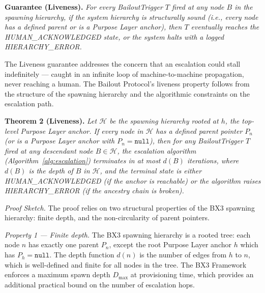 \documentclass[12pt]{article}
\begin{document}
\bigskip

\begin{minipage}{\linewidth}
\textbf{Guarantee (Liveness).} \textit{For every BailoutTrigger $T$ fired at any node $B$ in the spawning hierarchy, if the system hierarchy is structurally sound (i.e., every node has a defined parent or is a Purpose Layer anchor), then $T$ eventually reaches the HUMAN\_ACKNOWLEDGED state, or the system halts with a logged HIERARCHY\_ERROR.}
\end{minipage}

\bigskip

The Liveness guarantee addresses the concern that an escalation could stall indefinitely — caught in an infinite loop of machine-to-machine propagation, never reaching a human. The Bailout Protocol's liveness property follows from the structure of the spawning hierarchy and the algorithmic constraints on the escalation path.

\bigskip

\noindent\textbf{Theorem 2 (Liveness).}
\textit{Let $\mathcal{H}$ be the spawning hierarchy rooted at $h$, the top-level Purpose Layer anchor. If every node in $\mathcal{H}$ has a defined parent pointer $P_n$ (or is a Purpose Layer anchor with $P_n = \texttt{null}$), then for any BailoutTrigger $T$ fired at any descendant node $B \in \mathcal{H}$, the escalation algorithm (Algorithm~\ref{alg:escalation}) terminates in at most $d(B)$ iterations, where $d(B)$ is the depth of $B$ in $\mathcal{H}$, and the terminal state is either HUMAN\_ACKNOWLEDGED (if the anchor is reachable) or the algorithm raises HIERARCHY\_ERROR (if the ancestry chain is broken).}

\bigskip

\noindent\textit{Proof Sketch.} The proof relies on two structural properties of the BX3 spawning hierarchy: finite depth, and the non-circularity of parent pointers.

\medskip

\noindent\textit{Property 1 — Finite depth.} The BX3 spawning hierarchy is a rooted tree: each node $n$ has exactly one parent $P_n$, except the root Purpose Layer anchor $h$ which has $P_h = \texttt{null}$. The depth function $d(n)$ is the number of edges from $h$ to $n$, which is well-defined and finite for all nodes in the tree. The BX3 Framework enforces a maximum spawn depth $D_{\max}$ at provisioning time, which provides an additional practical bound on the number of escalation hops.

\medskip
\end{document}
